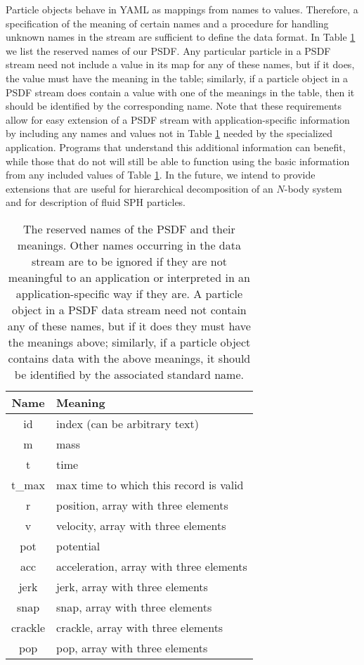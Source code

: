 \documentclass[5p,authoryear]{elsarticle}
\begin{document}
Particle objects behave in YAML as mappings from names to values.
Therefore, a specification of the meaning of certain names and a
procedure for handling unknown names in the stream are sufficient to
define the data format.  In Table \ref{tab:names} we list the reserved
names of our PSDF.  Any particular particle in a PSDF stream need not
include a value in its map for any of these names, but if it does, the
value must have the meaning in the table; similarly, if a particle
object in a PSDF stream does contain a value with one of the meanings
in the table, then it should be identified by the corresponding name.
Note that these requirements allow for easy extension of a PSDF stream
with application-specific information by including any names and
values not in Table \ref{tab:names} needed by the specialized
application.  Programs that understand this additional information can
benefit, while those that do not will still be able to function using
the basic information from any included values of Table
\ref{tab:names}.  In the future, we intend to provide extensions that
are useful for hierarchical decomposition of an $N$-body system and
for description of fluid SPH particles.

\begin{table}
\begin{tabular}{|c|l|}
\hline
Name & Meaning\\
\hline
id & index (can be arbitrary text)\\
m & mass\\
t & time\\
t\_max & max time to which this record is valid \\
r  & position, array with three elements\\
v  & velocity, array with three elements\\
pot  & potential\\
acc  & acceleration, array with three elements\\
jerk  & jerk, array with three elements\\
snap  & snap, array with three elements\\
crackle  & crackle, array with three elements\\
pop  & pop, array with three elements\\
\hline
\end{tabular}
\caption{\label{tab:names} The reserved names of the PSDF and their
  meanings.  Other names occurring in the data stream are to be
  ignored if they are not meaningful to an application or interpreted
  in an application-specific way if they are.  A particle object in a
  PSDF data stream need not contain any of these names, but if it does
  they must have the meanings above; similarly, if a particle object
  contains data with the above meanings, it should be identified by
  the associated standard name.}
\end{table}
\end{document}
